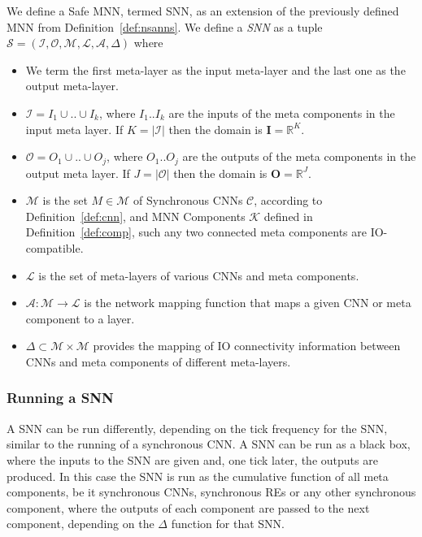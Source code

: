 \begin{definition}
	\label{def:snn}
	We define a Safe \ac{MNN}, termed \ac{SNN}, as an extension of the previously defined \ac{MNN} from Definition~\ref{def:nsanns}. We define a \emph{\ac{SNN}} as a tuple $\mathcal{S} = (\mathcal{I}, \mathcal{O}, \mathcal{M}, \mathcal{L}, \mathcal{A}, \Delta)$ where
	\begin{itemize}
		\item We term the first meta-layer as the input meta-layer and the last one as the output meta-layer.
		\item  $\mathcal{I}=I_1 \cup .. \cup I_k$, where $I_1..I_k$ are the inputs of the meta components in the input meta layer. If $K=|\mathcal{I}|$ then the domain is $\mathbf{I} = \mathbb{R}^K$.
		\item $\mathcal{O}=O_1 \cup .. \cup O_j$, where $O_1..O_j$ are the outputs of the meta components in the output meta layer. If $J=|\mathcal{O}|$ then the domain is $\mathbf{O} = \mathbb{R}^J$.
		\item $\mathcal{M}$ is the set $M \in \mathcal{M}$ of Synchronous \acp{CNN} $\mathcal{C}$, according to Definition~\ref{def:cnn}, and \ac{MNN} Components $\mathcal{K}$ defined in Definition~\ref{def:comp}, such any two connected meta components are IO-compatible.
		\item $\mathcal{L}$ is the set of meta-layers of various \acp{CNN} and meta components.
		\item $\mathcal{A}: \mathcal{M} \rightarrow \mathcal{L}$ is the network mapping function that maps a given \ac{CNN} or meta component to a layer.
		\item $\Delta \subset \mathcal{M} \times \mathcal{M}$ provides the mapping of IO connectivity information between \acp{CNN} and meta components of different meta-layers.
	\end{itemize}
\end{definition}

\subsubsection{Running a \ac{SNN}}
A \ac{SNN} can be run differently, depending on the tick frequency for the \ac{SNN}, similar to the running of a synchronous \ac{CNN}.
A \ac{SNN} can be run as a black box, where the inputs to the \ac{SNN} are given and, one tick later, the outputs are produced.
In this case the \ac{SNN} is run as the cumulative function of all meta components, be it synchronous \acp{CNN}, synchronous \acp{RE} or any other synchronous component, where the outputs of each component are passed to the next component, depending on the $\Delta$ function for that \ac{SNN}.

